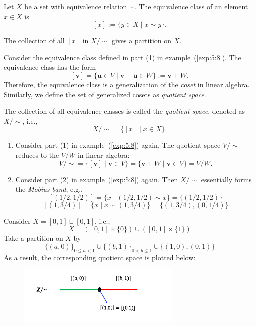 \begin{definition}
Let $X$ be a set with equivalence relation $\sim$. The equivalence class of an element $x\in X$ is
\[
[x]:=\{y\in X\mid x\sim y\}.
\]
\end{definition}
\begin{proposition}
The collection of all $[x]$ in $X/\sim$ gives a partition on $X$.
\end{proposition}
Consider the equivalence class defined in part (1) in example~(\ref{exp:5:8}). The equivalence class has the form
\[
[\bm v]= \{\bm u\in V\mid \bm v-\bm u\in W\}:=\bm v+W.
\]
Therefore, the equivalence class is a generalization of the \emph{coset} in linear algebra. Similarly, we define the set of generalized cosets as \emph{quotient space}.

\begin{definition}
The collection of all equivalence classes is called the \emph{quotient space}, denoted as $X/\sim$, i.e.,
\[
X/\sim = \{[x]\mid x\in X\}.
\]
\end{definition}

\begin{example}
\begin{enumerate}
\item
Consider part (1) in example~(\ref{exp:5:8}) again. The quotient space $V/\sim$ reduces to the $V/W$ in linear algebra:
\[
V/\sim = \{[\bm v]\mid \bm v\in V\}=\{\bm v+W\mid \bm v\in V\}=V/W.
\]
\item
Consider part (2) in example~(\ref{exp:5:8}) again. Then $X/\sim$ essentially forms the \emph{Mobius band}, e.g., 
\[
[(1/2,1/2)] = \{x\mid (1/2,1/2)\sim x\} = \{(1/2,1/2)\}
\]
\[
[(1,3/4)]=\{x\mid x\sim (1,3/4)\} = \{(1,3/4),(0,1/4)\}
\]
\end{enumerate}
\end{example}


\begin{example}
Consider $X=[0,1]\sqcup[0,1]$, i.e.,
\[
X = ([0,1]\times\{0\})\cup([0,1]\times\{1\})
\]
Take a partition on $X$ by 
\[
\{(a,0)\}_{0\le a<1}
\cup
\{(b,1)\}_{0<b\le1}
\cup
\{(1,0),(0,1)\}
\]
As a result, the corresponding quotient space is plotted below:
\begin{figure}[H]
\centering
\includegraphics[width=0.7\textwidth]{week5/p_7}
\end{figure}
\end{example}


